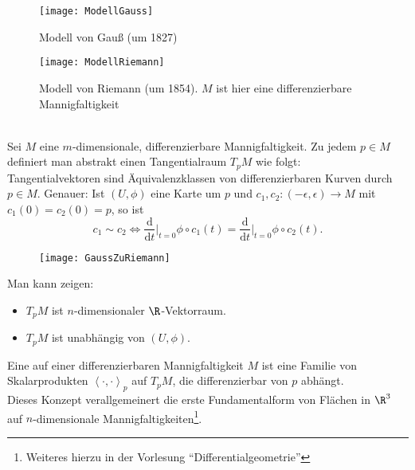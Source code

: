 \begin{minipage}{.475\textwidth}
  \begin{figure}[H]
    \texttt{[image: ModellGauss]}
    \caption{Modell von Gauß (um 1827)}
  \end{figure}
\end{minipage}
\hfill
\begin{minipage}{.475\textwidth}
  \begin{figure}[H]
    \texttt{[image: ModellRiemann]}
    \vspace{1em}
    \caption{Modell von Riemann (um 1854).\enskip{} \( M \) ist hier eine differenzierbare Mannigfaltigkeit}
  \end{figure}
\end{minipage}

\  \\

Sei \( M \) eine \( m \)-dimensionale, differenzierbare Mannigfaltigkeit. Zu jedem \( p \in M \) definiert man abstrakt einen Tangentialraum \( T_p M \) wie folgt: \\
Tangentialvektoren sind Äquivalenzklassen von differenzierbaren Kurven durch \( p \in M \). Genauer: Ist \( (U, \phi) \) eine Karte um \( p \) und \( c_1, c_2: (-\epsilon, \epsilon) \to M \) mit \( c_1(0) = c_2(0) = p \), so ist
\begin{equation*}
  c_1 \sim c_2 \Leftrightarrow \frac{\text{d}}{\text{d}t}\vert_{t = 0} \phi \circ c_1(t) = \frac{\text{d}}{\text{d}t}\vert_{t = 0} \phi \circ c_2(t)\text{.}
\end{equation*}

\begin{figure}[H]
  \texttt{[image: GaussZuRiemann]}
\end{figure}

Man kann zeigen:
\begin{itemize}
  \item \( T_p M \) ist \( n \)-dimensionaler \( \R \)-Vektorraum.
  \item \( T_p M \) ist unabhängig von \( (U, \phi) \).
\end{itemize}

\begin{definition}
  Eine  auf einer differenzierbaren Mannigfaltigkeit \( M \) ist eine Familie von Skalarprodukten \( \left\langle \cdot,\cdot \right\rangle_p \) auf \( T_p M \), die differenzierbar von \( p \) abhängt. \\
  Dieses Konzept verallgemeinert die erste Fundamentalform von Flächen in \( \R^3 \) auf \( n \)-dimensionale Mannigfaltigkeiten\footnote{Weiteres hierzu in der Vorlesung ``Differentialgeometrie''}.
\end{definition}

